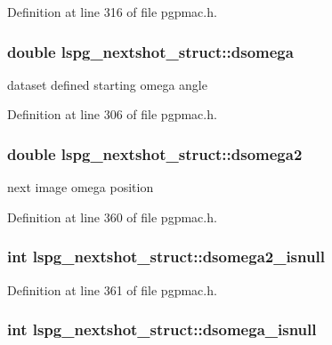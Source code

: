 Definition at line 316 of file pgpmac.\-h.

\hypertarget{structlspg__nextshot__struct_a4be525bb32fb0232c21a91529f1e8c73}{
\subsubsection[{dsomega}]{\setlength{\rightskip}{0pt plus 5cm}double lspg\-\_\-nextshot\-\_\-struct\-::dsomega}}\label{structlspg__nextshot__struct_a4be525bb32fb0232c21a91529f1e8c73}


dataset defined starting omega angle 



Definition at line 306 of file pgpmac.\-h.

\hypertarget{structlspg__nextshot__struct_a84ae35abfa725d1bdbff5403f6384ee4}{
\subsubsection[{dsomega2}]{\setlength{\rightskip}{0pt plus 5cm}double lspg\-\_\-nextshot\-\_\-struct\-::dsomega2}}\label{structlspg__nextshot__struct_a84ae35abfa725d1bdbff5403f6384ee4}


next image omega position 



Definition at line 360 of file pgpmac.\-h.

\hypertarget{structlspg__nextshot__struct_afaf9bdf89a68e7f479969072643e55eb}{
\subsubsection[{dsomega2\-\_\-isnull}]{\setlength{\rightskip}{0pt plus 5cm}int lspg\-\_\-nextshot\-\_\-struct\-::dsomega2\-\_\-isnull}}\label{structlspg__nextshot__struct_afaf9bdf89a68e7f479969072643e55eb}


Definition at line 361 of file pgpmac.\-h.

\hypertarget{structlspg__nextshot__struct_ad1da3548dc642d415aed53dc165c44fc}{
\subsubsection[{dsomega\-\_\-isnull}]{\setlength{\rightskip}{0pt plus 5cm}int lspg\-\_\-nextshot\-\_\-struct\-::dsomega\-\_\-isnull}}\label{structlspg__nextshot__struct_ad1da3548dc642d415aed53dc165c44fc}


